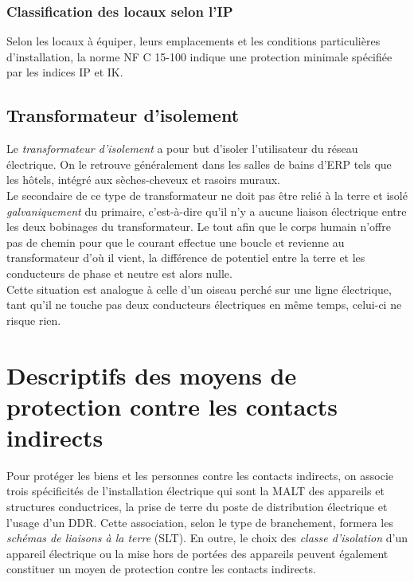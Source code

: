 \newpage
\begin{landscape}
\newpage



\newpage
\end{landscape}
\newpage

\subsubsection{Classification des locaux selon l'IP}

Selon les locaux à équiper, leurs emplacements et les conditions particulières d'installation, la norme NF C 15-100 indique une protection minimale spécifiée par les indices IP et IK.



\subsection{Transformateur d'isolement\label{subsec:transformateur_isolement}}

Le \emph{transformateur d'isolement} a pour but d'isoler l'utilisateur du réseau électrique. On le retrouve généralement dans les salles de bains d'ERP tels que les hôtels, intégré aux sèches-cheveux et rasoirs muraux.\\ 



Le secondaire de ce type de transformateur ne doit pas être relié à la terre et isolé \emph{galvaniquement} du primaire, c'est-à-dire qu'il n'y a aucune liaison électrique entre les deux bobinages du transformateur. Le tout afin que le corps humain n'offre pas de chemin pour que le courant effectue une boucle et revienne au transformateur d'où il vient, la différence de potentiel entre la terre et les conducteurs de phase et neutre est alors nulle.\\Cette situation est analogue à celle d'un oiseau perché sur une ligne électrique, tant qu'il ne touche pas deux conducteurs électriques en même temps, celui-ci ne risque rien.

\section{Descriptifs des moyens de protection contre les contacts indirects\label{sec:moyens_protection_contacts_indirects}}

Pour protéger les biens et les personnes contre les contacts indirects, on associe trois spécificités de l'installation électrique qui sont la MALT des appareils et structures conductrices, la prise de terre du poste de distribution électrique et l'usage d'un DDR. Cette association, selon le type de branchement, formera les \emph{schémas de liaisons à la terre} (SLT). En outre, le choix des \emph{classe d'isolation} d'un appareil électrique ou la mise hors de portées des appareils peuvent également constituer un moyen de protection contre les contacts indirects.

